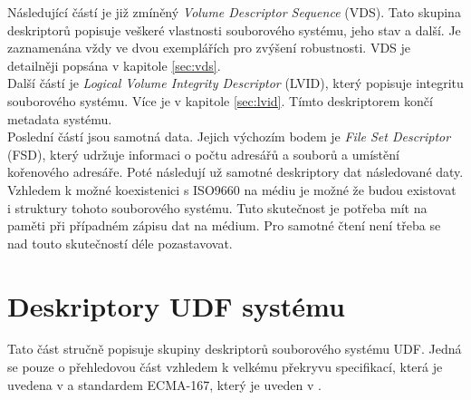 Následující částí je již zmíněný \textit{Volume Descriptor Sequence} (VDS). Tato skupina deskriptorů popisuje veškeré vlastnosti souborového systému, jeho stav a další. Je zaznamenána vždy ve dvou exemplářích pro zvýšení robustnosti. VDS je detailněji popsána v kapitole \ref{sec:vds}.\\
Další částí je \textit{Logical Volume Integrity Descriptor} (LVID), který popisuje integritu souborového systému. Více je v kapitole \ref{sec:lvid}. Tímto deskriptorem končí metadata systému.\\
Poslední částí jsou samotná data. Jejich výchozím bodem je \textit{File Set Descriptor} (FSD), který udržuje informaci o počtu adresářů a souborů a umístění kořenového adresáře. Poté následují už samotné deskriptory dat následované daty.\\
Vzhledem k možné koexistenici s ISO9660 na médiu je možné že budou existovat i struktury tohoto souborového systému. Tuto skutečnost je potřeba mít na paměti při případném zápisu dat na médium. Pro samotné čtení není třeba se nad touto skutečností déle pozastavovat.

\section{Deskriptory UDF systému}
Tato část stručně popisuje skupiny deskriptorů souborového systému UDF. Jedná se pouze o přehledovou část vzhledem k velkému překryvu specifikací, která je uvedena v \cite{osta-udf-0201} a standardem ECMA-167, který je uveden v \cite{ecma-167}.

